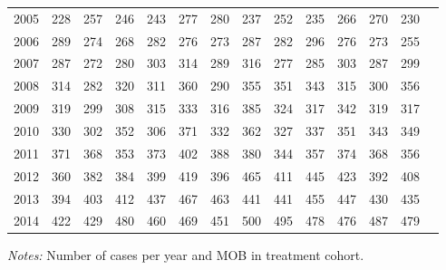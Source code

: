 \begin{table}[H]
\begin{threeparttable}
{\begin{tabular}{l*{13}{c}}
2005        &         228&         257&         246&         243&         277&         280&         237&         252&         235&         266&         270&         230\\
2006        &         289&         274&         268&         282&         276&         273&         287&         282&         296&         276&         273&         255\\
2007        &         287&         272&         280&         303&         314&         289&         316&         277&         285&         303&         287&         299\\
2008        &         314&         282&         320&         311&         360&         290&         355&         351&         343&         315&         300&         356\\
2009        &         319&         299&         308&         315&         333&         316&         385&         324&         317&         342&         319&         317\\
2010        &         330&         302&         352&         306&         371&         332&         362&         327&         337&         351&         343&         349\\
2011        &         371&         368&         353&         373&         402&         388&         380&         344&         357&         374&         368&         356\\
2012        &         360&         382&         384&         399&         419&         396&         465&         411&         445&         423&         392&         408\\
2013        &         394&         403&         412&         437&         467&         463&         441&         441&         455&         447&         430&         435\\
2014        &         422&         429&         480&         460&         469&         451&         500&         495&         478&         476&         487&         479\\
 \bottomrule \end{tabular} } \begin{tablenotes} \item \scriptsize \emph{Notes:} Number of cases per year and MOB in treatment cohort. \end{tablenotes} \end{threeparttable} \end{table} 
